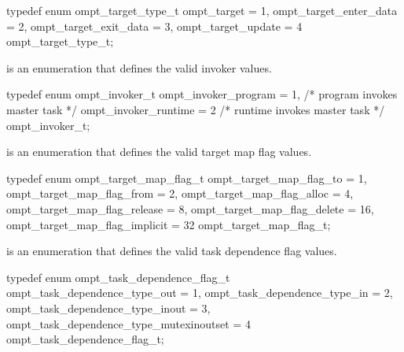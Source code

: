\begin{ccppspecific}
\begin{omptEnum}
typedef enum ompt_target_type_t {
  ompt_target                         = 1,
  ompt_target_enter_data              = 2,
  ompt_target_exit_data               = 3,
  ompt_target_update                  = 4
} ompt_target_type_t;
\end{omptEnum}
\end{ccppspecific}





\label{sec:ompt_invoker_t}
 is an enumeration that defines the valid invoker values.


\begin{ccppspecific}
\begin{omptEnum}
typedef enum ompt_invoker_t {
  ompt_invoker_program = 1, /* program invokes master task */
  ompt_invoker_runtime = 2  /* runtime invokes master task */
} ompt_invoker_t;
\end{omptEnum}
\end{ccppspecific}





\label{sec:ompt_target_map_flag_t}
 is an enumeration that defines the valid target map flag values.


\begin{ccppspecific}
\begin{omptEnum}
typedef enum ompt_target_map_flag_t {
  ompt_target_map_flag_to             = 1,
  ompt_target_map_flag_from           = 2,
  ompt_target_map_flag_alloc          = 4,
  ompt_target_map_flag_release        = 8,
  ompt_target_map_flag_delete         = 16,
  ompt_target_map_flag_implicit       = 32
} ompt_target_map_flag_t;
\end{omptEnum}
\end{ccppspecific}





\label{sec:ompt_task_dependence_flag_t}
 is an enumeration that defines the valid task dependence flag values.


\begin{ccppspecific}
\begin{omptEnum}
typedef enum ompt_task_dependence_flag_t {
  ompt_task_dependence_type_out             = 1,
  ompt_task_dependence_type_in              = 2,
  ompt_task_dependence_type_inout           = 3,
  ompt_task_dependence_type_mutexinoutset   = 4
} ompt_task_dependence_flag_t;
\end{omptEnum}
\end{ccppspecific}






